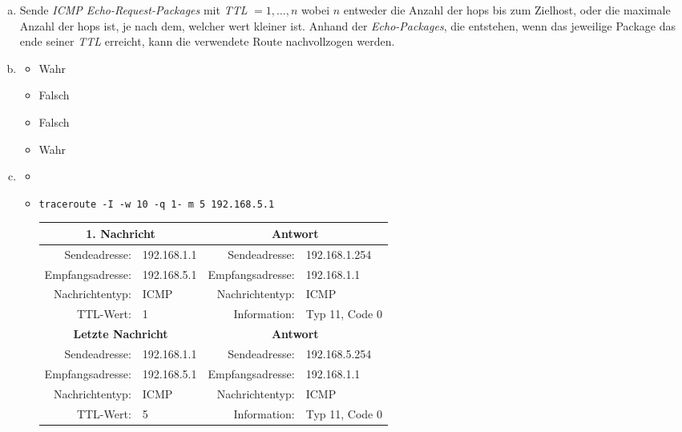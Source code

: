 \begin{enumerate}[a)]
	\item Sende \textit{ICMP Echo-Request-Packages} mit \textit{TTL} $= 1,\dots,n$ wobei $n$ entweder die Anzahl der hops bis zum Zielhost, oder die maximale Anzahl der hops ist, je nach dem, welcher wert kleiner ist. Anhand der \textit{Echo-Packages}, die entstehen, wenn das jeweilige Package das ende seiner \textit{TTL} erreicht, kann die verwendete Route nachvollzogen werden.

	\item \begin{itemize}
		\item Wahr
		\item Falsch
		\item Falsch
		\item Wahr
	\end{itemize}
	
	\item \begin{itemize}
		\item 
		\item \texttt{traceroute -I -w 10 -q 1- m 5 192.168.5.1}
		
		\begin{tabular}{|r|l|r|l|}
			\hline
			\multicolumn{2}{|c|}{\textbf{1. Nachricht}} & \multicolumn{2}{c|}{\textbf{Antwort}} \\ \hline
			Sendeadresse:    & 192.168.1.1 & Sendeadresse:    & 192.168.1.254 \\ \hline
			Empfangsadresse: & 192.168.5.1 & Empfangsadresse: & 192.168.1.1 \\ \hline
			Nachrichtentyp:  & ICMP        & Nachrichtentyp:  & ICMP \\ \hline
			TTL-Wert:        & 1           & Information:     & Typ 11, Code 0 \\ 
			\hline \hline
			\multicolumn{2}{|c|}{\textbf{Letzte Nachricht}} & \multicolumn{2}{c|}{\textbf{Antwort}} \\ \hline
			Sendeadresse:    & 192.168.1.1 & Sendeadresse:    & 192.168.5.254 \\ \hline
			Empfangsadresse: & 192.168.5.1 & Empfangsadresse: & 192.168.1.1 \\ \hline
			Nachrichtentyp:  & ICMP        & Nachrichtentyp:  & ICMP \\ \hline
			TTL-Wert:        & 5           & Information:     & Typ 11, Code 0 \\ \hline
			 
		\end{tabular}
	\end{itemize}
\end{enumerate}




